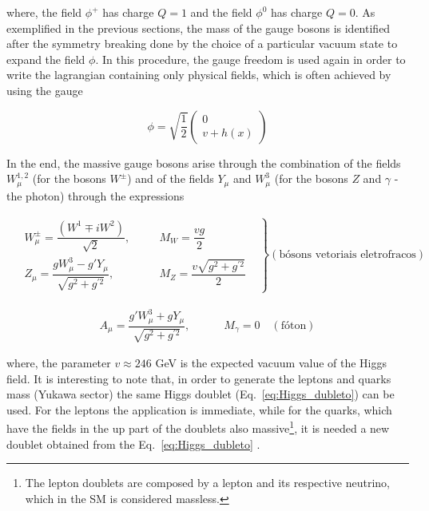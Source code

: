 where, the field $\phi^{+}$ has charge $Q=1$ and the field $\phi^{0}$ has charge $Q=0$. As exemplified in the previous sections, the mass of the gauge bosons is identified after the symmetry breaking done by the choice of a particular vacuum state to expand the field $\phi$. In this procedure, the gauge freedom is used again in order to write the lagrangian containing only physical fields, which is often achieved by using the gauge

\begin{equation}
\phi = \sqrt{\dfrac{1}{2}} \left( \begin{aligned} 0 \quad \quad \\ v+h(x) \end{aligned} \right)
\end{equation}

In the end, the massive gauge bosons arise through the combination of the fields $W_{\mu}^{1,2}$ (for the bosons $W^{\pm}$) and of the fields $Y_{\mu}$ and $W_{\mu}^3$ (for the bosons $Z$ and $\gamma$ - the photon) through the expressions

\begin{eqnarray}
\left. \begin{aligned} &W_{\mu}^{\pm} = \dfrac{(W^1 \mp iW^2)}{\sqrt{2}},& \quad &M_W = \dfrac{vg}{2}&\\[0.1cm]
&Z_{\mu} = \dfrac{gW_{\mu}^3 - g' Y_{\mu}}{\sqrt{g^2+g^{'2}}},& \quad &M_Z = \dfrac{v\sqrt{g^2+g^{'2}}}{2}& \end{aligned} \right\} (\textrm{bósons vetoriais eletrofracos})
\end{eqnarray}

\begin{eqnarray}
\left. A_{\mu} = \dfrac{g'W_{\mu}^3 + gY_{\mu}}{\sqrt{g^2+g^{'2}}}, \quad \quad \quad M_{\gamma} = 0 \quad \right. (\textrm{fóton})
\end{eqnarray}

where, the parameter $v \approx 246$ GeV is the expected vacuum value of the Higgs field. It is interesting to note that, in order to generate the leptons and quarks mass (Yukawa sector) the same Higgs doublet (Eq.~\ref{eq:Higgs_dubleto}) can be used. For the leptons the application is immediate, while for the quarks, which have the fields in the up part of the doublets also massive\footnote{The lepton doublets are composed by a lepton and its respective neutrino, which in the SM is considered massless.}, it is needed a new doublet obtained from the Eq.~\ref{eq:Higgs_dubleto} \cite{bib:halzen-martin-1984}.


